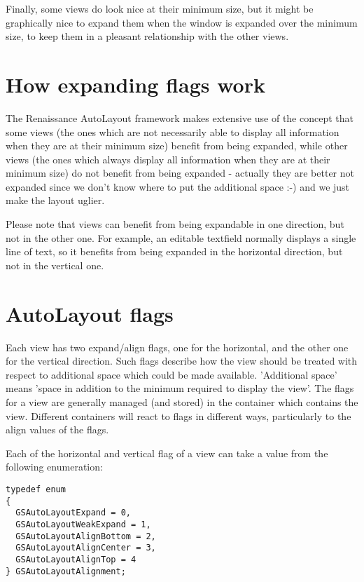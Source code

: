 Finally, some views do look nice at their minimum size, but it might
be graphically nice to expand them when the window is expanded over
the minimum size, to keep them in a pleasant relationship with the
other views.

\section{How expanding flags work}
The Renaissance AutoLayout framework makes extensive use of the
concept that some views (the ones which are not necessarily able to
display all information when they are at their minimum size) benefit
from being expanded, while other views (the ones which always display
all information when they are at their minimum size) do not benefit
from being expanded - actually they are better not expanded since we
don't know where to put the additional space :-) and we just make the
layout uglier.

Please note that views can benefit from being expandable in one
direction, but not in the other one.  For example, an editable
textfield normally displays a single line of text, so it benefits from
being expanded in the horizontal direction, but not in the vertical
one.

\section{AutoLayout flags}\label{autolayout-flags}
Each view has two expand/align flags, one for the horizontal, and the
other one for the vertical direction.  Such flags describe how the
view should be treated with respect to additional space which could be
made available.  'Additional space' means 'space in addition to the
minimum required to display the view'.  The flags for a view are
generally managed (and stored) in the container which contains the
view.  Different containers will react to flags in different ways,
particularly to the align values of the flags.

Each of the horizontal and vertical flag of a view can take a value
from the following enumeration:
\begin{verbatim}
typedef enum 
{
  GSAutoLayoutExpand = 0,
  GSAutoLayoutWeakExpand = 1,
  GSAutoLayoutAlignBottom = 2,
  GSAutoLayoutAlignCenter = 3,
  GSAutoLayoutAlignTop = 4
} GSAutoLayoutAlignment;
\end{verbatim}

